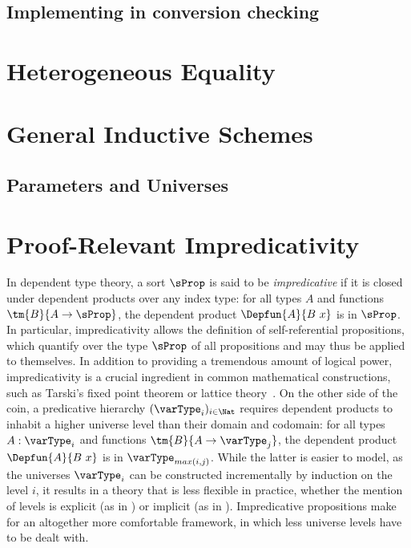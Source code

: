 \subsection{Implementing  in conversion checking}



\section{Heterogeneous Equality}

\section{General Inductive Schemes}

\subsection{Parameters and Universes}

\section{Proof-Relevant Impredicativity}
\label{sec:proof-rel-impred}

In dependent type theory, a sort \( \sProp \) is said to be
\emph{impredicative} if it is closed under dependent products over any index
type: for all types \( A \) and functions \( \tm{B}{A \to \sProp} \),
the dependent product \( \Depfun{A}{B\ x} \) is in \( \sProp \).
%
In particular, impredicativity allows the definition of self-referential propositions,
which quantify over the type \( \sProp \) of all propositions and may thus
be applied to themselves.
%
In addition to providing a tremendous amount of logical power, impredicativity is
a crucial ingredient in common mathematical constructions, such as
Tarski's fixed point theorem or lattice theory~.
%
On the other side of the coin, a predicative hierarchy $(\varType_i)_{i \in \Nat}$
requires dependent products to inhabit a higher universe level
than their domain and codomain: for all types \( A : \varType_i \) and functions
\( \tm{B}{A \to \varType_j} \), the dependent product
\( \Depfun{A}{B\ x} \) is in \( \varType_{max(i,j)} \).
%
While the latter is easier to model, as the universes $\varType_i$ can be
constructed incrementally by induction on the level $i$, it results
in a theory that is less flexible in practice, whether the mention of
levels is explicit (as in \Agda) or implicit (as in \Coq).
%
Impredicative propositions make for an altogether
more comfortable framework, in which less universe levels have to
be dealt with.

